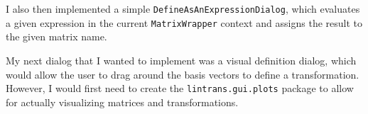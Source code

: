 \documentclass[../development.tex]{subfiles}
\begin{document}

I also then implemented a simple \texttt{DefineAsAnExpressionDialog}, which evaluates a given expression in the current \texttt{MatrixWrapper} context and assigns the result to the given matrix name.


My next dialog that I wanted to implement was a visual definition dialog, which would allow the user to drag around the basis vectors to define a transformation. However, I would first need to create the \texttt{lintrans.gui.plots} package to allow for actually visualizing matrices and transformations.
\end{document}
